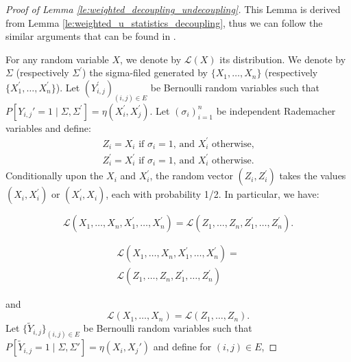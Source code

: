 \documentclass[letterpaper]{article} %
\def\DoubleColumn{}
\def\DoubleColumnEnd{}
\def\SingleColumn{}
\def\SingleColumnEnd{}
\newcommand{\Pro}{P}
\newcommand{\pair}[1]{(#1)}
\newcommand{\set}[1]{\{#1\}}
\begin{document}
\begin{proof}[Proof of Lemma \ref{le:weighted_decoupling_undecoupling}] %
    This Lemma is derived from Lemma \ref{le:weighted_u_statistics_decoupling}, thus we can follow the similar arguments that can be found in \cite{de2012decoupling}.

    For any random variable $X$, we denote by $\mathcal L(X)$ its distribution. We denote by $\Sigma$ (respectively $\Sigma^\prime$) the sigma-filed generated by $\{X_1,\dots,X_n\}$ (respectively $\{X_1^\prime,\dots,X_n^\prime\}$). Let $(Y_{i,j}^\prime)_{(i,j)\in E}$ be Bernoulli random variables such that $\Pro[Y_{i,j}'=1\mid \Sigma, \Sigma^\prime]=\eta(X_i^\prime, X_j^\prime)$. Let $(\sigma_i)_{i=1}^n$ be independent Rademacher variables and define:
    \begin{align*}
        Z_i = X_i \text{ if } \sigma_i = 1 \text{, and } X_i^\prime \text{ otherwise,}\\
        Z_i^\prime = X_i^\prime \text{ if } \sigma_i = 1 \text{, and } X_i^\prime \text{ otherwise.}
    \end{align*}
    Conditionally upon the $X_i$ and $X_i^\prime$, the random vector $(Z_i, Z_i^\prime)$ takes the values $(X_i, X_i^\prime)$ or $(X_i^\prime, X_i)$, each with probability 1/2. In particular, we have:
    \SingleColumn
    \begin{equation}
        \label{eq:weighted_u_statistics_decoupling_fact1}
        \mathcal L(X_1,\dots,X_n,X_1^\prime,\dots,X_n^\prime) = \mathcal L(Z_1,\dots,Z_n,Z_1^\prime,\dots,Z_n^\prime).
    \end{equation}
    \SingleColumnEnd
    \DoubleColumn
    \begin{equation}
        \begin{aligned}
            \label{eq:weighted_u_statistics_decoupling_fact1}
            \mathcal L(X_1,\dots,X_n,X_1^\prime,\dots,X_n^\prime) =\\ \mathcal L(Z_1,\dots,Z_n,Z_1^\prime,\dots,Z_n^\prime)
        \end{aligned}
    \end{equation}
    \DoubleColumnEnd
    and
    \begin{equation}
        \label{eq:weighted_u_statistics_decoupling_fact2}
        \mathcal L(X_1,\dots,X_n) = \mathcal L(Z_1,\dots,Z_n).
    \end{equation}
    Let $\set{\tilde{Y}_{i,j}}_{\pair{i,j}\in E}$ be Bernoulli random variables such that $\Pro[\tilde{Y}_{i,j}=1 \mid \Sigma,\Sigma'] = \eta(X_i, X_j')$ and define for $\pair{i,j}\in E$,

\end{proof}
\end{document}
